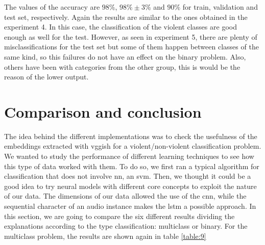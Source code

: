 	The values of the accuracy are $98\%$, $98\% \pm 3\%$ and $90\%$ for train, validation and test set, respectively. Again the results are similar to the ones obtained in the experiment 4. In this case, the classification of the violent classes are good enough as well for the test. However, as seen in experiment 5, there are plenty of misclassifications for the test set but some of them happen between classes of the same kind, so this failures do not have an effect on the binary problem. Also, others have been  with categories from the other group, this is would be the reason of the lower output. 
	
\section{Comparison and conclusion}
	
	The idea behind the different implementations was to check the usefulness of the embeddings extracted with \acrshort{vgg}ish for a violent/non-violent classification problem. We wanted to study the performance of different learning techniques to see how this type of data worked with them. To do so, we first ran a typical algorithm for classification that does not involve \acrlong{nn}, an \acrshort{svm}. Then, we thought it could be a good idea to try neural models with different core concepts to exploit the nature of our data. The dimensions of our data allowed the use of the \acrshort{cnn}, while the sequential character of an audio instance makes the \acrshort{lstm} a possible approach. In this section, we are going to compare the six different results dividing the explanations according to the type classification: multiclass or binary. For the multiclass problem, the results are shown again in table \ref{table:9}
	
	\begin{table}[h!]
		\begin{center}
		\end{center}
		\caption{Accuracy results for the three different algorithms and the three sets}
		\label{table:9}
	\end{table}

